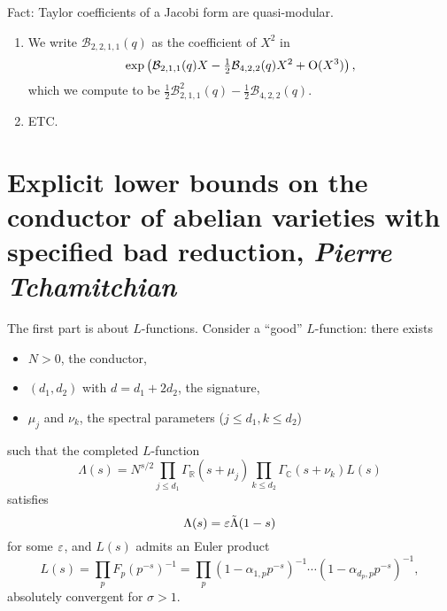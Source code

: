 \documentclass[reqno]{amsart} 
\begin{document}
Fact: Taylor coefficients of a Jacobi form are quasi-modular.

\begin{example}[$k=2=s+1, r=1$]
  \begin{enumerate}
  \item We write $\mathcal{B}_{2, 2, 1, 1}(q)$ as the coefficient of $X^2$ in
    \begin{equation*}
      \exp \left( \mathcal{B}_{2, 1, 1}(q) X - \tfrac{1}{2} \mathcal{B}_{4, 2, 2}(q) X^2 + \operatorname{O}(X^3) \right),
    \end{equation*}
    which we compute to be $\tfrac{1}{2} \mathcal{B}_{2, 1, 1}^2(q) - \tfrac{1}{2} \mathcal{B}_{4, 2, 2}(q)$.
  \item ETC.
  \end{enumerate}
\end{example}


\section{Explicit lower bounds on the conductor of abelian varieties with specified bad reduction, \textnormal{\emph{Pierre Tchamitchian}}}

The first part is about $L$-functions.  Consider a ``good'' $L$-function: there exists
\begin{itemize}
\item $N > 0$, the conductor,
\item $(d_1, d_2)$ with $d = d_1 + 2 d_2$, the signature,
\item $\mu_j$ and $\nu_k$, the spectral parameters ($j \leq d_1, k \leq d_2$)
\end{itemize}
such that the completed $L$-function
\begin{equation*}
  \Lambda(s) = N^{s/2}
  \prod_{j \leq d_1}
  \Gamma_{\mathbb{R}}(s + \mu_j) \prod_{k \leq d_2} \Gamma_{\mathbb{C}}(s + \nu_k) L(s)
\end{equation*}
satisfies
\begin{equation*}
  \Lambda(s) = \varepsilon \tilde{\Lambda}(1 - s)
\end{equation*}
for some $\varepsilon$, and $L(s)$ admits an Euler product
\begin{equation*}
  L(s) = \prod_p F_p(p^{- s})^{-1}
  = \prod_p
  \left( 1 - \alpha_{1, p} p^{- s} \right)^{-1}
  \dotsb
  \left( 1 - \alpha_{d_p, p} p^{- s} \right)^{-1},
\end{equation*}
absolutely convergent for $\sigma > 1$.
\end{document}
